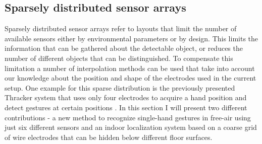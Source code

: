 \subsection{Sparsely distributed sensor arrays}
Sparsely distributed sensor arrays refer to layouts that limit the number of available sensors either by environmental parameters or by design. This limits the information that can be gathered about the detectable object, or reduces the number of different objects that can be distinguished. To compensate this limitation a number of interpolation methods can be used that take into account our knowledge about the position and shape of the electrodes used in the current setup. One example for this sparse distribution is the previously presented Thracker system that uses only four electrodes to acquire a hand position and detect gestures at certain positions \cite{Wimmer2007a}. In this section I will present two different contributions - a new method to recognize single-hand gestures in free-air using just six different sensors and an indoor localization system based on a coarse grid of wire electrodes that can be hidden below different floor surfaces.
